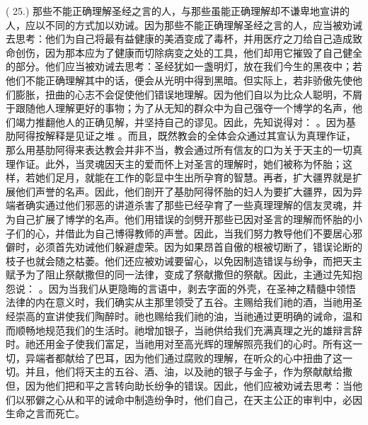 ( 25.) 那些不能正确理解圣经之言的人，与那些虽能正确理解却不谦卑地宣讲的人，应以不同的方式加以劝诫。因为那些不能正确理解圣经之言的人，应当被劝诫去思考：他们为自己将最有益健康的美酒变成了毒杯，并用医疗之刀给自己造成致命创伤，因为那本应为了健康而切除病变之处的工具，他们却用它摧毁了自己健全的部分。他们应当被劝诫去思考：圣经犹如一盏明灯，放在我们今生的黑夜中；若他们不能正确理解其中的话，便会从光明中得到黑暗。但实际上，若非骄傲先使他们膨胀，扭曲的心志不会促使他们错误地理解。因为他们自以为比众人聪明，不屑于跟随他人理解更好的事物；为了从无知的群众中为自己强夺一个博学的名声，他们竭力推翻他人的正确见解，并坚持自己的谬见。因此，先知说得对： 。因为基肋阿得按解释是见证之堆 。而且，既然教会的全体会众通过其宣认为真理作证，那么用基肋阿得来表达教会并非不当，教会通过所有信友的口为关于天主的一切真理作证。此外，当灵魂因天主的爱而怀上对圣言的理解时，她们被称为怀胎；这样，若她们足月，就能在工作的彰显中生出所孕育的智慧。再者，扩大疆界就是扩展他们声誉的名声。因此，他们剖开了基肋阿得怀胎的妇人为要扩大疆界，因为异端者确实通过他们邪恶的讲道杀害了那些已经孕育了一些真理理解的信友灵魂，并为自己扩展了博学的名声。他们用错误的剑劈开那些已因对圣言的理解而怀胎的小子们的心，并借此为自己博得教师的声誉。因此，当我们努力教导他们不要居心邪僻时，必须首先劝诫他们躲避虚荣。因为如果昂首自傲的根被切断了，错误论断的枝子也就会随之枯萎。他们还应被劝诫要留心，以免因制造错误与纷争，而把天主赋予为了阻止祭献撒但的同一法律，变成了祭献撒但的祭献。因此，主通过先知抱怨说： 。因为当我们从更隐晦的言语中，剥去字面的外壳，在圣神之精髓中领悟法律的内在意义时，我们确实从主那里领受了五谷。主赐给我们祂的酒，当祂用圣经崇高的宣讲使我们陶醉时。祂也赐给我们祂的油，当祂通过更明确的诫命，温和而顺畅地规范我们的生活时。祂增加银子，当祂供给我们充满真理之光的雄辩言辞时。祂还用金子使我们富足，当祂用对至高光辉的理解照亮我们的心时。所有这一切，异端者都献给了巴耳，因为他们通过腐败的理解，在听众的心中扭曲了这一切。并且，他们将天主的五谷、酒、油，以及祂的银子与金子，作为祭献献给撒但，因为他们把和平之言转向助长纷争的错误。因此，他们应被劝诫去思考：当他们以邪僻之心从和平的诫命中制造纷争时，他们自己，在天主公正的审判中，必因生命之言而死亡。\par

